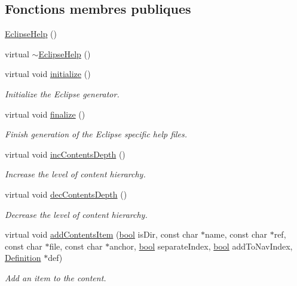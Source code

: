 \subsection*{Fonctions membres publiques}
\begin{DoxyCompactItemize}
\item 
\hyperlink{class_eclipse_help_a4f1bd0f9c58507da2b24c9491200bf8a}{Eclipse\+Help} ()
\item 
virtual \hyperlink{class_eclipse_help_a09fa77b331a5f5bc951428aecd9f34cc}{$\sim$\+Eclipse\+Help} ()
\item 
virtual void \hyperlink{class_eclipse_help_aefada9c9b474d36ef9b771e2361c8dc1}{initialize} ()
\begin{DoxyCompactList}\small\item\em Initialize the Eclipse generator. \end{DoxyCompactList}\item 
virtual void \hyperlink{class_eclipse_help_a6a8532316d47986f371459e6b09b9d71}{finalize} ()
\begin{DoxyCompactList}\small\item\em Finish generation of the Eclipse specific help files. \end{DoxyCompactList}\item 
virtual void \hyperlink{class_eclipse_help_a84c091576dab518ca0301144b96cc826}{inc\+Contents\+Depth} ()
\begin{DoxyCompactList}\small\item\em Increase the level of content hierarchy. \end{DoxyCompactList}\item 
virtual void \hyperlink{class_eclipse_help_a20d28e23b12cd60a358e7a07fd713262}{dec\+Contents\+Depth} ()
\begin{DoxyCompactList}\small\item\em Decrease the level of content hierarchy. \end{DoxyCompactList}\item 
virtual void \hyperlink{class_eclipse_help_a72d1c982cb362cc6b52660f9f93a95c6}{add\+Contents\+Item} (\hyperlink{qglobal_8h_a1062901a7428fdd9c7f180f5e01ea056}{bool} is\+Dir, const char $\ast$name, const char $\ast$ref, const char $\ast$file, const char $\ast$anchor, \hyperlink{qglobal_8h_a1062901a7428fdd9c7f180f5e01ea056}{bool} separate\+Index, \hyperlink{qglobal_8h_a1062901a7428fdd9c7f180f5e01ea056}{bool} add\+To\+Nav\+Index, \hyperlink{class_definition}{Definition} $\ast$def)
\begin{DoxyCompactList}\small\item\em Add an item to the content. \end{DoxyCompactList}\item 

\end{DoxyCompactItemize}
